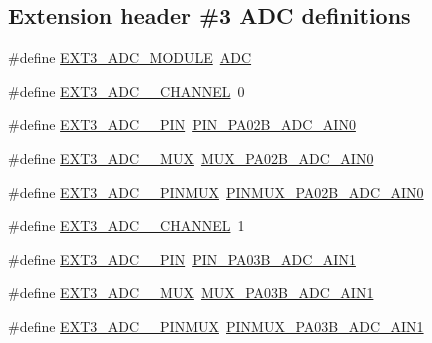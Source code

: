 \subsection*{Extension header \#3 A\+DC definitions}
\begin{DoxyCompactItemize}
\item 
\#define \mbox{\hyperlink{group__samd21__xplained__pro__features__group_ga1c580a78f53f567f9d686e2a84a22071}{E\+X\+T3\+\_\+\+A\+D\+C\+\_\+\+M\+O\+D\+U\+LE}}~\mbox{\hyperlink{group___s_a_m_d21_j18_a__base_ga54d148b91f3d356713f7e367a2243bea}{A\+DC}}
\item 
\#define \mbox{\hyperlink{group__samd21__xplained__pro__features__group_gadd6748e8f065715e279c5f0397523d8c}{E\+X\+T3\+\_\+\+A\+D\+C\+\_\+\_\+\+C\+H\+A\+N\+N\+EL}}~0
\item 
\#define \mbox{\hyperlink{group__samd21__xplained__pro__features__group_ga5eb6b74f07202306adcc8ac71477d0e0}{E\+X\+T3\+\_\+\+A\+D\+C\+\_\+\_\+\+P\+IN}}~\mbox{\hyperlink{pio_2samd21j18a_8h_a28e2b578252cab66df91b7f96be1a6e9}{P\+I\+N\+\_\+\+P\+A02\+B\+\_\+\+A\+D\+C\+\_\+\+A\+I\+N0}}
\item 
\#define \mbox{\hyperlink{group__samd21__xplained__pro__features__group_gafae155279974f051965f5878c396fcbd}{E\+X\+T3\+\_\+\+A\+D\+C\+\_\+\_\+\+M\+UX}}~\mbox{\hyperlink{pio_2samd21j18a_8h_aeb9c3f042d6f297474c5ddbc041b4a6c}{M\+U\+X\+\_\+\+P\+A02\+B\+\_\+\+A\+D\+C\+\_\+\+A\+I\+N0}}
\item 
\#define \mbox{\hyperlink{group__samd21__xplained__pro__features__group_ga7e7cfb3c414e187d3d2770e45bb3b8ef}{E\+X\+T3\+\_\+\+A\+D\+C\+\_\+\_\+\+P\+I\+N\+M\+UX}}~\mbox{\hyperlink{pio_2samd21j18a_8h_ad91f6d6606f1aa0b6f8aff1ed51470dc}{P\+I\+N\+M\+U\+X\+\_\+\+P\+A02\+B\+\_\+\+A\+D\+C\+\_\+\+A\+I\+N0}}
\item 
\#define \mbox{\hyperlink{group__samd21__xplained__pro__features__group_gaf5d8ab29e2335e2a3495181f59f5e4ab}{E\+X\+T3\+\_\+\+A\+D\+C\+\_\+\_\+\+C\+H\+A\+N\+N\+EL}}~1
\item 
\#define \mbox{\hyperlink{group__samd21__xplained__pro__features__group_gaac2e37593f0f7f467adf2f75e77a2cc3}{E\+X\+T3\+\_\+\+A\+D\+C\+\_\+\_\+\+P\+IN}}~\mbox{\hyperlink{pio_2samd21j18a_8h_a2e57923c9cb67bd9c9614bcc1df27e64}{P\+I\+N\+\_\+\+P\+A03\+B\+\_\+\+A\+D\+C\+\_\+\+A\+I\+N1}}
\item 
\#define \mbox{\hyperlink{group__samd21__xplained__pro__features__group_gab517825e26b66dd5e8a496254d1ff476}{E\+X\+T3\+\_\+\+A\+D\+C\+\_\+\_\+\+M\+UX}}~\mbox{\hyperlink{pio_2samd21j18a_8h_aac43bf79382a905448a4200057a7b63e}{M\+U\+X\+\_\+\+P\+A03\+B\+\_\+\+A\+D\+C\+\_\+\+A\+I\+N1}}
\item 
\#define \mbox{\hyperlink{group__samd21__xplained__pro__features__group_ga452a453e54d6ebe5f16fa57830febbe1}{E\+X\+T3\+\_\+\+A\+D\+C\+\_\+\_\+\+P\+I\+N\+M\+UX}}~\mbox{\hyperlink{pio_2samd21j18a_8h_a33675d8f161bbb880b11380d504c7008}{P\+I\+N\+M\+U\+X\+\_\+\+P\+A03\+B\+\_\+\+A\+D\+C\+\_\+\+A\+I\+N1}}
\end{DoxyCompactItemize}
